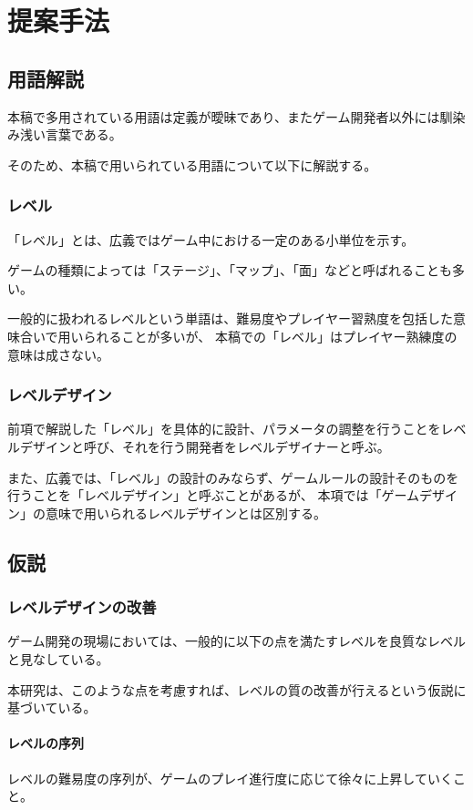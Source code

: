 \chapter{提案手法}
\section{用語解説}
本稿で多用されている用語は定義が曖昧であり、またゲーム開発者以外には馴染み浅い言葉である。

そのため、本稿で用いられている用語について以下に解説する。

\subsection{レベル}
「レベル」とは、広義ではゲーム中における一定のある小単位を示す。

ゲームの種類によっては「ステージ」、「マップ」、「面」などと呼ばれることも多い。

一般的に扱われるレベルという単語は、難易度やプレイヤー習熟度を包括した意味合いで用いられることが多いが、
本稿での「レベル」はプレイヤー熟練度の意味は成さない。


\subsection{レベルデザイン}
前項で解説した「レベル」を具体的に設計、パラメータの調整を行うことをレベルデザインと呼び、それを行う開発者をレベルデザイナーと呼ぶ。


また、広義では、「レベル」の設計のみならず、ゲームルールの設計そのものを行うことを「レベルデザイン」と呼ぶことがあるが、
本項では「ゲームデザイン」の意味で用いられるレベルデザインとは区別する。


\section{仮説}
\subsection{レベルデザインの改善}
ゲーム開発の現場においては、一般的に以下の点を満たすレベルを良質なレベルと見なしている。

本研究は、このような点を考慮すれば、レベルの質の改善が行えるという仮説に基づいている。

\subsubsection{レベルの序列}
レベルの難易度の序列が、ゲームのプレイ進行度に応じて徐々に上昇していくこと。

